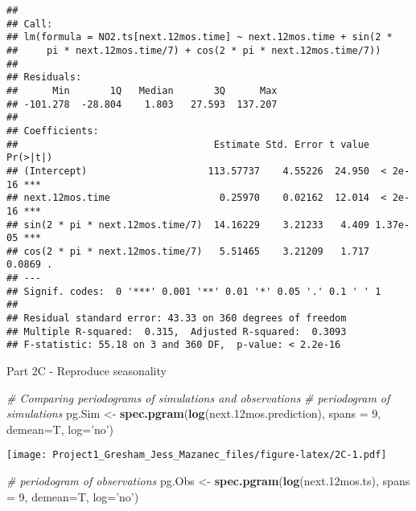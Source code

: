 \documentclass[
]{article}
\newenvironment{Shaded}{\begin{snugshade}}{\end{snugshade}}
\newcommand{\CommentTok}[1]{\textcolor[rgb]{0.56,0.35,0.01}{\textit{#1}}}
\newcommand{\DataTypeTok}[1]{\textcolor[rgb]{0.13,0.29,0.53}{#1}}
\newcommand{\DecValTok}[1]{\textcolor[rgb]{0.00,0.00,0.81}{#1}}
\newcommand{\FloatTok}[1]{\textcolor[rgb]{0.00,0.00,0.81}{#1}}
\newcommand{\KeywordTok}[1]{\textcolor[rgb]{0.13,0.29,0.53}{\textbf{#1}}}
\newcommand{\NormalTok}[1]{#1}
\newcommand{\StringTok}[1]{\textcolor[rgb]{0.31,0.60,0.02}{#1}}
\begin{document}
\begin{verbatim}
## 
## Call:
## lm(formula = NO2.ts[next.12mos.time] ~ next.12mos.time + sin(2 * 
##     pi * next.12mos.time/7) + cos(2 * pi * next.12mos.time/7))
## 
## Residuals:
##      Min       1Q   Median       3Q      Max 
## -101.278  -28.804    1.803   27.593  137.207 
## 
## Coefficients:
##                                  Estimate Std. Error t value Pr(>|t|)    
## (Intercept)                     113.57737    4.55226  24.950  < 2e-16 ***
## next.12mos.time                   0.25970    0.02162  12.014  < 2e-16 ***
## sin(2 * pi * next.12mos.time/7)  14.16229    3.21233   4.409 1.37e-05 ***
## cos(2 * pi * next.12mos.time/7)   5.51465    3.21209   1.717   0.0869 .  
## ---
## Signif. codes:  0 '***' 0.001 '**' 0.01 '*' 0.05 '.' 0.1 ' ' 1
## 
## Residual standard error: 43.33 on 360 degrees of freedom
## Multiple R-squared:  0.315,  Adjusted R-squared:  0.3093 
## F-statistic: 55.18 on 3 and 360 DF,  p-value: < 2.2e-16
\end{verbatim}

\begin{Shaded}
\end{Shaded}

Part 2C - Reproduce seasonality

\begin{Shaded}
\begin{Highlighting}[]
\CommentTok{# Comparing periodograms of simulations and observations}
\CommentTok{# periodogram of simulations}
\NormalTok{pg.Sim <-}\StringTok{ }\KeywordTok{spec.pgram}\NormalTok{(}\KeywordTok{log}\NormalTok{(next}\FloatTok{.12}\NormalTok{mos.prediction), }\DataTypeTok{spans =} \DecValTok{9}\NormalTok{, }\DataTypeTok{demean=}\NormalTok{T, }\DataTypeTok{log=}\StringTok{'no'}\NormalTok{)}
\end{Highlighting}
\end{Shaded}

\texttt{[image: Project1\_Gresham\_Jess\_Mazanec\_files/figure-latex/2C-1.pdf]}

\begin{Shaded}
\begin{Highlighting}[]
\CommentTok{# periodogram of observations}
\NormalTok{pg.Obs <-}\StringTok{ }\KeywordTok{spec.pgram}\NormalTok{(}\KeywordTok{log}\NormalTok{(next}\FloatTok{.12}\NormalTok{mos.ts), }\DataTypeTok{spans =} \DecValTok{9}\NormalTok{, }\DataTypeTok{demean=}\NormalTok{T, }\DataTypeTok{log=}\StringTok{'no'}\NormalTok{)}
\end{Highlighting}
\end{Shaded}
\end{document}
